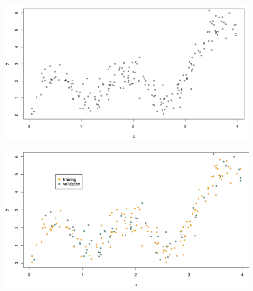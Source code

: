 \documentclass[xetex,mathserif,serif,aspectratio=169]{beamer}
\begin{document}
\begin{frame}[fragile] \frametitle{} \oldB \small

\begin{center}
\includegraphics[width=\textwidth]{img/valid1.pdf}
\end{center}

\end{frame}

\begin{frame}[fragile] \frametitle{} \oldB \small

\begin{center}
\includegraphics[width=\textwidth]{img/valid2.pdf}
\end{center}

\end{frame}
\end{document}
